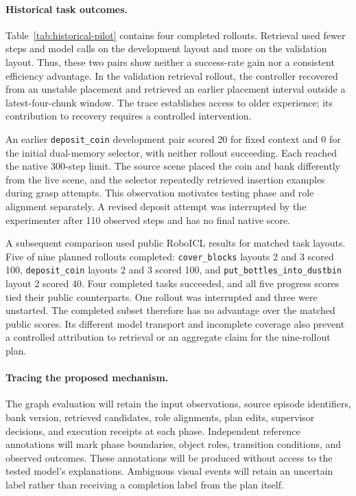 \paragraph{Historical task outcomes.}
Table~\ref{tab:historical-pilot} contains four completed rollouts. Retrieval used fewer steps and model calls on the development layout and more on the validation layout. Thus, these two pairs show neither a success-rate gain nor a consistent efficiency advantage. In the validation retrieval rollout, the controller recovered from an unstable placement and retrieved an earlier placement interval outside a latest-four-chunk window. The trace establishes access to older experience; its contribution to recovery requires a controlled intervention.

An earlier \texttt{deposit\_coin} development pair scored 20 for fixed context and 0 for the initial dual-memory selector, with neither rollout succeeding. Each reached the native 300-step limit. The source scene placed the coin and bank differently from the live scene, and the selector repeatedly retrieved insertion examples during grasp attempts. This observation motivates testing phase and role alignment separately. A revised deposit attempt was interrupted by the experimenter after 110 observed steps and has no final native score.

A subsequent comparison used public RoboICL results for matched task layouts. Five of nine planned rollouts completed: \texttt{cover\_blocks} layouts 2 and 3 scored 100, \texttt{deposit\_coin} layouts 2 and 3 scored 100, and \texttt{put\_bottles\_into\_dustbin} layout 2 scored 40. Four completed tasks succeeded, and all five progress scores tied their public counterparts. One rollout was interrupted and three were unstarted. The completed subset therefore has no advantage over the matched public scores. Its different model transport and incomplete coverage also prevent a controlled attribution to retrieval or an aggregate claim for the nine-rollout plan.

\paragraph{Tracing the proposed mechanism.}
The graph evaluation will retain the input observations, source episode identifiers, bank version, retrieved candidates, role alignments, plan edits, supervisor decisions, and execution receipts at each phase. Independent reference annotations will mark phase boundaries, object roles, transition conditions, and observed outcomes. These annotations will be produced without access to the tested model's explanations. Ambiguous visual events will retain an uncertain label rather than receiving a completion label from the plan itself.

